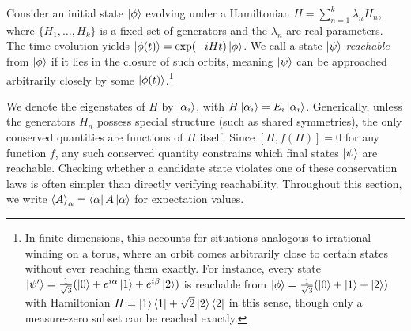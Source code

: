 \documentclass[aps,prx,reprint,superscriptaddress,footnote, twocolumn,notitlepage]{revtex4-2}
\begin{document}



Consider an initial state $\ket{\phi}$ evolving under a Hamiltonian $H = \sum_{n=1}^{k} \lambda_n H_n$, where $\{H_1, \ldots, H_k\}$ is a fixed set of generators and the $\lambda_n$ are real parameters. The time evolution yields $\ket{\phi(t)} = \exp(-iHt)\ket{\phi}$. We call a state $\ket{\psi}$ \emph{reachable} from $\ket{\phi}$ if it lies in the closure of such orbits, meaning $\ket{\psi}$ can be approached arbitrarily closely by some $\ket{\phi(t)}$.\footnote{In finite dimensions, this accounts for situations analogous to irrational winding on a torus, where an orbit comes arbitrarily close to certain states without ever reaching them exactly. For instance, every state $\ket{\psi'} = \frac{1}{\sqrt{3}}(\ket{0} + e^{i\alpha}\ket{1} + e^{i\beta}\ket{2})$ is reachable from $\ket{\phi} = \frac{1}{\sqrt{3}}(\ket{0} + \ket{1} + \ket{2})$ with Hamiltonian $H = \ket{1}\bra{1} + \sqrt{2}\ket{2}\bra{2}$ in this sense, though only a measure-zero subset can be reached exactly.}

We denote the eigenstates of $H$ by $\ket{\alpha_i}$, with $H\ket{\alpha_i} = E_i\ket{\alpha_i}$. Generically, unless the generators $H_n$ possess special structure (such as shared symmetries), the only conserved quantities are functions of $H$ itself. Since $[H, f(H)] = 0$ for any function $f$, any such conserved quantity constrains which final states $\ket{\psi}$ are reachable. Checking whether a candidate state violates one of these conservation laws is often simpler than directly verifying reachability. Throughout this section, we write $\braket{A}_\alpha = \bra{\alpha}A\ket{\alpha}$ for expectation values.
\end{document}
